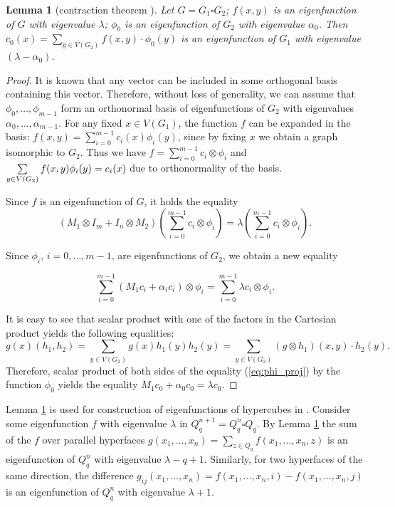 \documentclass[11pt]{article}
\newtheorem{lemma}{Lemma}[section]
\theoremstyle{definition}
\begin{document}
\begin{lemma}[contraction theorem  \cite{Taranenko}]\label{l:phi_projection}
Let $G=G_1\square G_2$; $f(x,y)$ is an eigenfunction of $G$ with
eigenvalue $\lambda$; $\phi_0$ is an eigenfunction of 
$G_2$ with eigenvalue $\alpha_0$. Then
$c_0(x)=\sum\limits_{y\in V(G_2)} f(x,y)\cdot \phi_0(y)$ is an eigenfunction of $G_1$ with eigenvalue $(\lambda -
\alpha_0)$.
\end{lemma}
\begin{proof}
It is known that any vector can be included in some orthogonal
basis containing this vector. Therefore, without loss of generality,
we can assume that $\phi_0,\ldots,\phi_{m-1}$
form an orthonormal basis of eigenfunctions of  $G_2$ with
eigenvalues 
$\alpha_0,\ldots,\alpha_{m-1}$.  For
any fixed $x\in V(G_1)$,   the function $f$ can be expanded in the basis:
$f(x,y)=\sum\limits_{i=0}^{m-1} c_i(x) \phi_i(y)$, since by
 fixing $x$ we obtain a graph
isomorphic to $G_2$. Thus we have
$f=\sum\limits_{i=0}^{m-1}c_i\otimes\phi_i$ 
and
$\sum\limits\limits_{y\in V(G_2)}f(x,y) \phi_i(y)=c_i(x)$ due to
orthonormality of the basis.

Since $f$ is an eigenfunction of $G$, it holds the equality
$$(M_1 \otimes
I_{m} + I_{n} \otimes
M_2)\left(\sum\limits_{i=0}^{m-1}c_i\otimes\phi_i\right)=\lambda\left(\sum\limits_{i=0}^{m-1}c_i\otimes\phi_i\right).$$

Since $\phi_i$, $i=0,\dots, m-1$, are eigenfunctions of $G_2$, we obtain a new equality

\begin{equation}\label{eq:phi_proj}
\sum\limits_{i=0}^{m-1}(M_1c_i+\alpha_ic_i)\otimes\phi_i=\sum\limits_{i=0}^{m-1}\lambda
c_i\otimes\phi_i.
\end{equation}

It is easy to see that scalar product with one of the factors
in the Cartesian product yields the following equalities:
$$g(x)(h_1,h_2)=\sum\limits_{{y\in V(G_2)}}g(x)h_1(y)h_2(y)=
\sum\limits_{{y\in V(G_2)}}(g\otimes h_1)(x,y)\cdot h_2(y).$$
Therefore, scalar product of both sides of the equality (\ref{eq:phi_proj})
by the function $\phi_0$ yields the equality $M_1c_0+\alpha_0c_0=\lambda
c_0$.
\end{proof}


Lemma \ref{l:phi_projection} is used for construction of eigenfunctions of hypercubes in \cite{ValVor}.
Consider
some eigenfunction $f$ with eigenvalue $\lambda$ in
 $Q^{n+1}_q=Q^n_q\square Q_q$. By   Lemma  \ref{l:phi_projection} the sum of the  $f$
 over parallel  hyperfaces
$g(x_1,\dots,x_n)=\sum\limits_{z\in Q_q}f(x_1,\dots,x_n,z)$ 
is an eigenfunction of $Q^n_q$ with eigenvalue
$\lambda - q+1$.  Similarly, for two hyperfaces
of the same direction, the difference
$g_{ij}(x_1,\dots,x_n)=f(x_1,\dots,x_n,i) - f(x_1,\dots,x_n,j)$ 
is an eigenfunction of  $Q^n_q$ with eigenvalue
$\lambda + 1$. 
\end{document}
